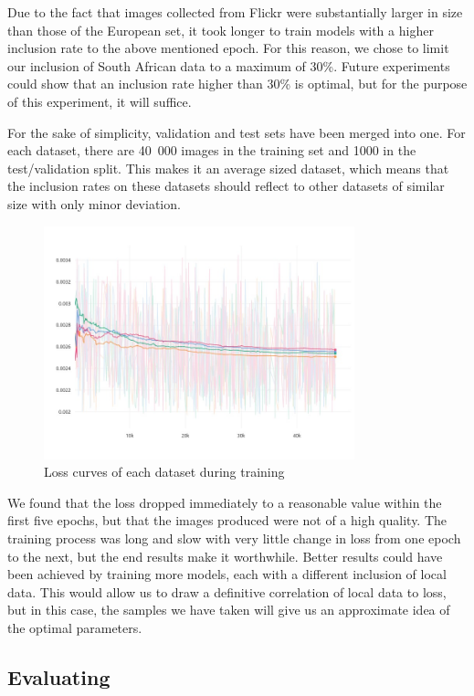 \documentclass[conference]{IEEEtran}
\begin{document}
Due to the fact that images collected from Flickr were substantially larger in size than those of the European set, it took longer to train models with a higher inclusion rate to the above mentioned epoch. For this reason, we chose to limit our inclusion of South African data to a maximum of 30\%. Future experiments could show that an inclusion rate higher than 30\% is optimal, but for the purpose of this experiment, it will suffice.

For the sake of simplicity, validation and test sets have been merged into one. For each dataset, there are 40~000 images in the training set and 1000 in the test/validation split. This makes it an average sized dataset, which means that the inclusion rates on these datasets should reflect to other datasets of similar size with only minor deviation.

\begin{figure}[h]
\centering
\includegraphics[width=9cm]{Curves/loss_train}
\caption{Loss curves of each dataset during training}
\label{fig:loss_train}
\end{figure}

We found that the loss dropped immediately to a reasonable value within the first five epochs, but that the images produced were not of a high quality. The training process was long and slow with very little change in loss from one epoch to the next, but the end results make it worthwhile. Better results could have been achieved by training more models, each with a different inclusion of local data. This would allow us to draw a definitive correlation of local data to loss, but in this case, the samples we have taken will give us an approximate idea of the optimal parameters.


\subsection{Evaluating}
\end{document}

